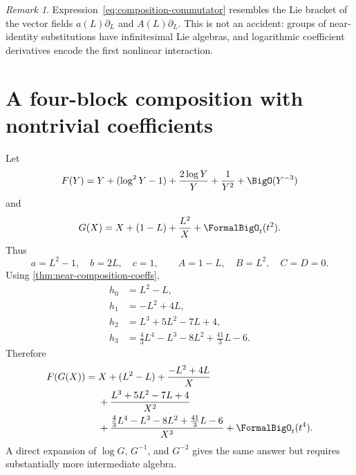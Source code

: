 \documentclass[11pt,openany]{book}
\theoremstyle{definition}
\theoremstyle{plain}
\theoremstyle{remark}
\newtheorem{remark}{Remark}[chapter]
\begin{document}
\begin{remark}
Expression~\eqref{eq:composition-commutator} resembles the Lie bracket of the
vector fields \(a(L)\partial_L\) and \(A(L)\partial_L\).  This is not an
accident: groups of near-identity substitutions have infinitesimal Lie
algebras, and logarithmic coefficient derivatives encode the first nonlinear
interaction.
\end{remark}

\section{A four-block composition with nontrivial coefficients}
Let
\[
 F(Y)=Y+(\log^2Y-1)+\frac{2\log Y}{Y}+\frac1{Y^2}+\BigO(Y^{-3})
\]
and
\[
 G(X)=X+(1-L)+\frac{L^2}{X}+\FormalBigO_t(t^2).
\]
Thus
\[
 a=L^2-1,
 \quad b=2L,
 \quad c=1,
 \qquad
 A=1-L,
 \quad B=L^2,
 \quad C=D=0.
\]
Using \cref{thm:near-composition-coeffs},
\begin{align*}
 h_0&=L^2-L,\\
 h_1&=-L^2+4L,\\
 h_2&=L^3+5L^2-7L+4,\\
 h_3&=\frac43L^4-L^3-8L^2+\frac{41}{3}L-6.
\end{align*}
Therefore
\begin{equation}\label{eq:worked-composition-four}
\begin{split}
 F(G(X))={}&X+(L^2-L)+\frac{-L^2+4L}{X}\\
 &+\frac{L^3+5L^2-7L+4}{X^2}\\
 &+\frac{\tfrac43L^4-L^3-8L^2+\tfrac{41}{3}L-6}{X^3}
 +\FormalBigO_t(t^4).
\end{split}
\end{equation}
A direct expansion of \(\log G\), \(G^{-1}\), and \(G^{-2}\) gives the same
answer but requires substantially more intermediate algebra.
\end{document}
